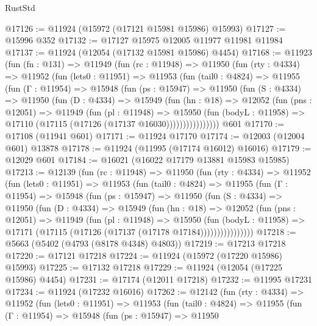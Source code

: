 \begin{lexlean}{RustStd}
\begin{coremodule}
@17126 := @11924 (@15972 (@17121 @15981 @15986) @15993)
@17127 := @15996 @352
@17132 := @17127 @15975 @12005 @11977 @11981 @11984
@17137 := @11924 (@12054 (@17132 @15981 @15986) @4454)
@17168 := @11923
    (fun (fn : @131) =>
    @11949
      (fun (rc : @11948) =>
      @11950
        (fun (rty : @4334) =>
        @11952
          (fun (lets0 : @11951) =>
          @11953
            (fun (tail0 : @4824) =>
            @11955
              (fun (Γ : @11954) =>
              @15948
                (fun (ps : @15947) =>
                @11950
                  (fun (S : @4334) =>
                  @11950
                    (fun (D : @4334) =>
                    @15949
                      (fun (hn : @18) =>
                      @12052
                        (fun (pns : @12051) =>
                        @11949
                          (fun (pl : @11948) =>
                          @15950
                            (fun (bodyL : @11958) =>
                            @17110 (@17115 (@17126 (@17137 @16030))))))))))))))))
    @601
@17170 := @17108 (@11941 @601)
@17171 := @11924 @17170
@17174 := @12003 (@12004 @601) @13878
@17178 := @11924 (@11995 (@17174 @16012) @16016)
@17179 := @12029 @601
@17184 := @16021 (@16022 @17179 @13881 @15983 @15985)
@17213 := @12139
    (fun (rc : @11948) =>
    @11950
      (fun (rty : @4334) =>
      @11952
        (fun (lets0 : @11951) =>
        @11953
          (fun (tail0 : @4824) =>
          @11955
            (fun (Γ : @11954) =>
            @15948
              (fun (ps : @15947) =>
              @11950
                (fun (S : @4334) =>
                @11950
                  (fun (D : @4334) =>
                  @15949
                    (fun (hn : @18) =>
                    @12052
                      (fun (pns : @12051) =>
                      @11949
                        (fun (pl : @11948) =>
                        @15950
                          (fun (bodyL : @11958) =>
                          @17171 (@17115 (@17126 (@17137 (@17178 @17184))))))))))))))))
@17218 := @5663 (@5402 (@4793 (@8178 @4348) @4803))
@17219 := @17213 @17218
@17220 := @17121 @17218
@17224 := @11924 (@15972 (@17220 @15986) @15993)
@17225 := @17132 @17218
@17229 := @11924 (@12054 (@17225 @15986) @4454)
@17231 := @17174 (@12011 @17218)
@17232 := @11995 @17231
@17234 := @11924 (@17232 @16016)
@17262 := @12142
    (fun (rty : @4334) =>
    @11952
      (fun (lets0 : @11951) =>
      @11953
        (fun (tail0 : @4824) =>
        @11955
          (fun (Γ : @11954) =>
          @15948
            (fun (ps : @15947) =>
            @11950

\end{coremodule}
\end{lexlean}
